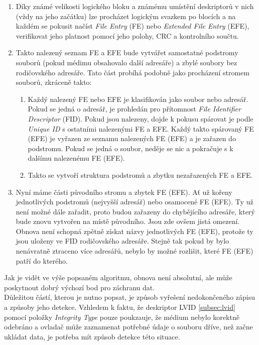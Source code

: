 \begin{enumerate}
    \item Díky známé velikosti logického bloku a známému umístění deskriptorů v nich (vždy na jeho začátku) lze procházet logickým svazkem po blocích a na každém se pokusit načíst \textit{File Entry} (FE) nebo \textit{Extended File Entry} (EFE), verifikovat jeho platnost pomocí jeho polohy, CRC a kontrolního součtu.
    \item Takto nalezený seznam FE a EFE bude vytvářet samostatné podstromy souborů (pokud médimu obsahovalo další adresáře) a zbylé soubory bez rodičovského adresáře. Tato část probíhá podobně jako procházení stromem souborů, zkráceně takto:
    \begin{enumerate}
        \item Každý nalezený FE nebo EFE je klasifikován jako soubor nebo adresář. Pokud se jedná o adresář, je prohledán pro přítomnost \textit{File Identifier Descriptor} (FID). Pokud jsou nalezeny, dojde k pokusu spárovat je podle \textit{Unique ID} s ostatními nalezenými FE a EFE. Každý takto spárovaný FE (EFE) je vyřazen ze seznamu nalezených FE (EFE) a je zařazen do podstromu. Pokud se jedná o soubor, neděje se nic a pokračuje s k dalšímu nalezenému FE (EFE).
        \item Takto se vytvoří struktura podstromů a zbytku nezařazených FE a EFE.
    \end{enumerate}
    \item Nyní máme části původního stromu a zbytek FE (EFE). Ať už kořeny jednotlivých podstromů (nejvyšší adresář) nebo osamocené FE (EFE). Ty už není možné dále zařadit, proto budou zařazeny do chybějícího adresáře, který bude znovu vytvořen na místě původního. Jsou zde ovšem jistá omezení. Obnova není schopná zpětně získat názvy jednotlivých FE (EFE), protože ty jsou uloženy ve FID rodičovského adresáře. Stejně tak pokud by bylo nenávratně ztraceno více adresářů, nebylo by možné rozlišit, které FE (EFE) patří do kterého. 
\end{enumerate}
Jak je vidět ve výše popsaném algoritmu, obnova není absolutní, ale může poskytnout dobrý výchozí bod pro záchranu dat.\\
Důležitou částí, kterou je nutno popsat, je způsob vyřešení nedokončeného zápisu a způsoby jeho detekce. Vzhledem k faktu, že deskriptor LVID \ref{subsec:lvid} pomocí položky \textit{Integrity Type} pouze poukzauje, že médium nebylo korektně odebráno a ovladač může zaznamenat potřebné údaje o souboru dříve, než začne ukládat data, je potřeba mít způsob detekce této situace.\\
